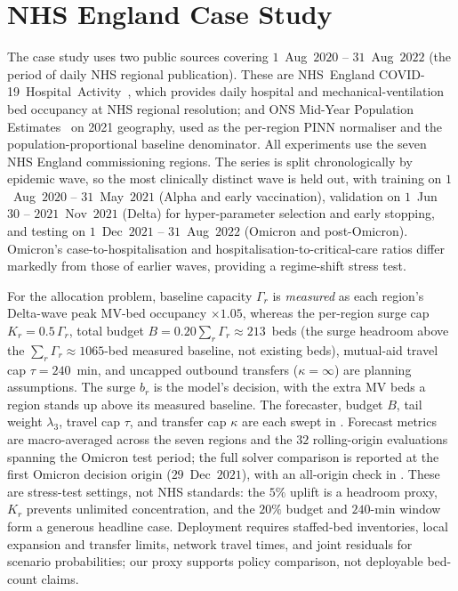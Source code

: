 \section{NHS England Case Study}\label{sec:case_study}

The case study uses two public sources covering $1$~Aug~$2020$ -- $31$~Aug~$2022$ (the period of daily NHS regional publication). These are NHS~England COVID-19~Hospital~Activity~\cite{nhs_covid_activity}, which provides daily hospital and mechanical-ventilation bed occupancy at NHS regional resolution; and ONS Mid-Year Population Estimates~\cite{ons_mye_2021} on 2021 geography, used as the per-region PINN normaliser and the population-proportional baseline denominator. All experiments use the seven NHS England commissioning regions. The series is split chronologically by epidemic wave, so the most clinically distinct wave is held out, with training on $1$~Aug~$2020$ -- $31$~May~$2021$ (Alpha and early vaccination), validation on $1$~Jun~$30$ -- $2021$~Nov~$2021$ (Delta) for hyper-parameter selection and
early stopping, and testing on $1$~Dec~$2021$ -- $31$~Aug~$2022$ (Omicron and post-Omicron). Omicron's case-to-hospitalisation and
hospitalisation-to-critical-care ratios differ markedly from those of earlier waves, providing a regime-shift stress test.

For the allocation problem, baseline capacity $\Gamma_r$ is \emph{measured}
as each region's Delta-wave peak MV-bed occupancy $\times 1.05$, whereas
the per-region surge cap $K_r=0.5\,\Gamma_r$, total budget
$B=0.20\sum_r \Gamma_r\approx213$~beds (the surge headroom above the
$\sum_r\Gamma_r\approx1065$-bed measured baseline, not existing beds),
mutual-aid travel cap $\tau=240$~min, and
uncapped outbound transfers ($\kappa=\infty$) are
planning assumptions. The surge $b_r$ is the model's decision, with the
extra MV beds a region stands up above its measured baseline. The
forecaster, budget $B$, tail weight $\lambda_3$, travel cap $\tau$, and
transfer cap $\kappa$ are each swept in . Forecast
metrics are macro-averaged across
the seven regions and the $32$ rolling-origin evaluations spanning the
Omicron test period; the full solver comparison is reported at the first
Omicron decision origin ($29$~Dec~$2021$), with an
all-origin check in .
These are stress-test settings, not NHS standards: the $5\%$ uplift is
a headroom proxy, $K_r$ prevents unlimited concentration, and the
$20\%$ budget and $240$-min window form a generous headline case.
Deployment requires staffed-bed inventories, local expansion and
transfer limits, network travel times, and joint residuals for scenario
probabilities; our proxy supports policy comparison, not deployable
bed-count claims.
